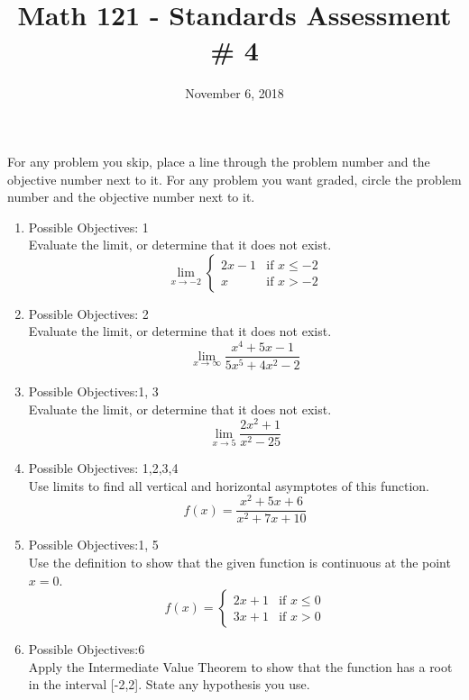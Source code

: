 \documentclass{exam}
\title{Math 121 - Standards Assessment \# 4}
\date{November 6, 2018}
\begin{document}
\maketitle
\bigskip

\begin{center}
\large
    For any problem you skip, place a line through the problem number and the objective number next to it. For any problem you want graded, circle the problem number and the objective number next to it.
\end{center}
\normalsize

\begin{enumerate}
\item Possible Objectives: 1\\
Evaluate the limit, or determine that it does not exist.
$$\lim_{x \rightarrow -2} \left\{\begin{array}{rl} 2x-1 & \mbox{if } x \leq -2 \\ x & \mbox{if } x > -2 \end{array}\right.$$
\item Possible Objectives: 2\\
Evaluate the limit, or determine that it does not exist.
$$\lim_{x\rightarrow \infty} \frac{x^4 + 5x - 1}{5x^5 +4x^2 - 2}$$
\item Possible Objectives:1, 3\\
Evaluate the limit, or determine that it does not exist.
$$\lim_{x \rightarrow 5}  \frac{2x^2 + 1}{x^2 - 25}$$
\item Possible Objectives: 1,2,3,4\\
Use limits to find all vertical and horizontal asymptotes of this function.
$$f(x) = \frac{x^2 + 5x + 6}{x^2 + 7x + 10}$$
\item Possible Objectives:1, 5\\
Use the definition to show that the given function is continuous at the point $x = 0$.
$$f(x) = \left\{ \begin{array}{rl} 2x+1 & \mbox{if } x \leq 0 \\ 3x+1 & \mbox{if } x > 0\end{array}\right.$$
\item Possible Objectives:6\\
Apply the Intermediate Value Theorem to show that the function has a root in the interval [-2,2]. State any hypothesis you use.

\end{enumerate}
\end{document}
